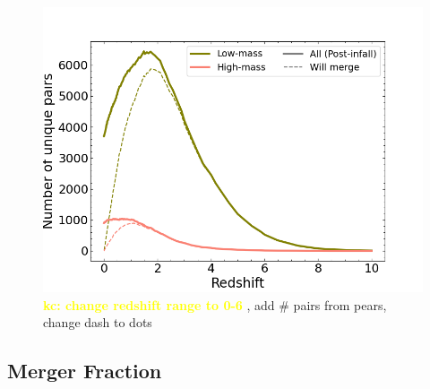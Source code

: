 \documentclass[twocolumn]{aastex631}
\newcommand{\kc}[1]{\textcolor{yellow}{\textbf{kc: #1}} }
\begin{document}
\begin{figure}[htb]
    \begin{center}
    \includegraphics[width=\columnwidth]{plots/bet-on-it/3_number_pairs.png}
    \caption{\kc{change redshift range to 0-6}, add \# pairs from pears, change dash to dots}
    \label{fig:num-pairs}
    \end{center}
\end{figure}



\subsection{Merger Fraction}
\end{document}
